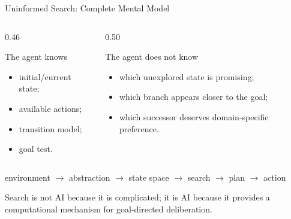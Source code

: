 \documentclass[aspectratio=169,10pt]{beamer}
\begin{document}
\begin{frame}[shrink=20]{Uninformed Search: Complete Mental Model}
  \begin{columns}[T,onlytextwidth]
    \begin{column}{0.46\textwidth}
      \begin{block}{The agent knows}
        \begin{itemize}
          \item initial/current state;
          \item available actions;
          \item transition model;
          \item goal test.
        \end{itemize}
      \end{block}
    \end{column}

    \begin{column}{0.50\textwidth}
      \begin{block}{The agent does not know}
        \begin{itemize}
          \item which unexplored state is promising;
          \item which branch appears closer to the goal;
          \item which successor deserves domain-specific preference.
        \end{itemize}
      \end{block}
    \end{column}
  \end{columns}

  \begin{center}
    \large environment $\rightarrow$ abstraction $\rightarrow$ state space $\rightarrow$ search $\rightarrow$ plan $\rightarrow$ action
  \end{center}

  \begin{keyidea}
    Search is not AI because it is complicated; it is AI because it provides a computational mechanism for goal-directed deliberation.
  \end{keyidea}
\end{frame}
\end{document}
